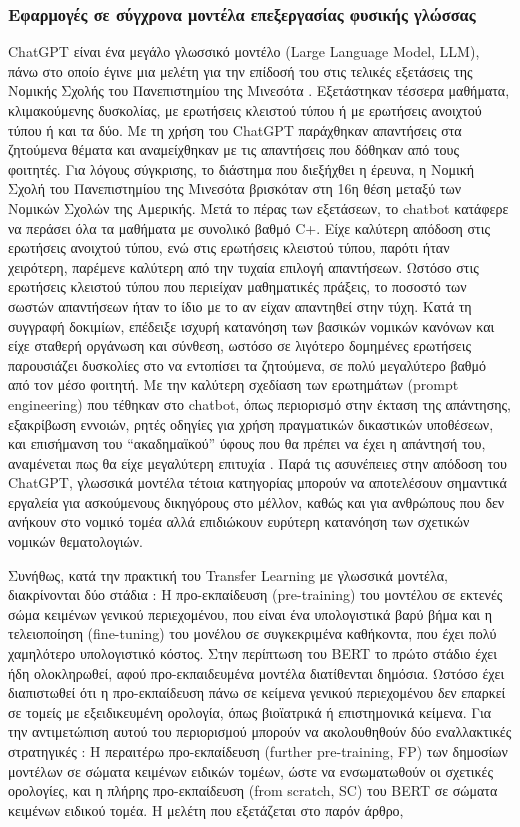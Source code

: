 \documentclass{article}
\begin{document}
\subsubsection{Εφαρμογές σε σύγχρονα μοντέλα επεξεργασίας φυσικής γλώσσας}
 ChatGPT είναι ένα μεγάλο γλωσσικό μοντέλο (Large Language Model, LLM), πάνω στο οποίο έγινε μια μελέτη για την επίδοσή του στις τελικές εξετάσεις της Νομικής Σχολής του Πανεπιστημίου της Μινεσότα \cite{choi-2023}. Εξετάστηκαν τέσσερα μαθήματα, κλιμακούμενης δυσκολίας, με ερωτήσεις κλειστού τύπου ή με ερωτήσεις ανοιχτού τύπου ή και τα δύο. Με τη χρήση του ChatGPT παράχθηκαν απαντήσεις στα ζητούμενα θέματα και αναμείχθηκαν με τις απαντήσεις που δόθηκαν από τους φοιτητές. Για λόγους σύγκρισης, το διάστημα που διεξήχθει η έρευνα, η Νομική Σχολή του Πανεπιστημίου της Μινεσότα βρισκόταν στη 16η θέση μεταξύ των Νομικών Σχολών της Αμερικής. Μετά το πέρας των εξετάσεων, το chatbot κατάφερε να περάσει όλα τα μαθήματα με συνολικό βαθμό C+. Είχε καλύτερη απόδοση στις ερωτήσεις ανοιχτού τύπου, ενώ στις ερωτήσεις κλειστού τύπου, παρότι ήταν χειρότερη, παρέμενε καλύτερη από την τυχαία επιλογή απαντήσεων. Ωστόσο στις ερωτήσεις κλειστού τύπου που περιείχαν μαθηματικές πράξεις, το ποσοστό των σωστών απαντήσεων ήταν το ίδιο με το αν είχαν απαντηθεί στην τύχη. Κατά τη συγγραφή δοκιμίων, επέδειξε ισχυρή κατανόηση των βασικών νομικών κανόνων και είχε σταθερή οργάνωση και σύνθεση, ωστόσο σε λιγότερο δομημένες ερωτήσεις παρουσιάζει δυσκολίες στο να εντοπίσει τα ζητούμενα, σε πολύ μεγαλύτερο βαθμό από τον μέσο φοιτητή. Με την καλύτερη σχεδίαση των ερωτημάτων (prompt engineering) που τέθηκαν στο chatbot, όπως περιορισμό στην έκταση της απάντησης, εξακρίβωση εννοιών,  ρητές οδηγίες για χρήση πραγματικών δικαστικών υποθέσεων, και επισήμανση του “ακαδημαϊκού” ύφους που θα πρέπει να έχει η απάντησή του, αναμένεται πως θα είχε μεγαλύτερη επιτυχία \cite{choi-2023}. Παρά τις ασυνέπειες στην απόδοση του ChatGPT, γλωσσικά μοντέλα τέτοια κατηγορίας μπορούν να αποτελέσουν σημαντικά εργαλεία για ασκούμενους δικηγόρους στο μέλλον, καθώς και για ανθρώπους που δεν ανήκουν στο νομικό τομέα αλλά επιδιώκουν ευρύτερη κατανόηση των σχετικών νομικών θεματολογιών.
\par Συνήθως, κατά την πρακτική του Transfer Learning με γλωσσικά μοντέλα, διακρίνονται δύο στάδια : Η προ-εκπαίδευση (pre-training) του μοντέλου σε εκτενές σώμα κειμένων γενικού περιεχομένου, που είναι ένα υπολογιστικά βαρύ βήμα και η τελειοποίηση (fine-tuning) του μονέλου σε συγκεκριμένα καθήκοντα, που έχει πολύ χαμηλότερο υπολογιστικό κόστος. Στην περίπτωση του BERT το πρώτο στάδιο έχει ήδη ολοκληρωθεί, αφού προ-εκπαιδευμένα μοντέλα διατίθενται δημόσια. Ωστόσο έχει διαπιστωθεί ότι η προ-εκπαίδευση πάνω σε κείμενα γενικού περιεχομένου δεν επαρκεί σε τομείς με εξειδικευμένη ορολογία, όπως βιοϊατρικά ή επιστημονικά κείμενα. Για την αντιμετώπιση αυτού του περιορισμού μπορούν να ακολουθηθούν δύο εναλλακτικές στρατηγικές : Η περαιτέρω προ-εκπαίδευση (further pre-training, FP) των δημοσίων μοντέλων σε σώματα κειμένων ειδικών τομέων, ώστε να ενσωματωθούν οι σχετικές ορολογίες, και η πλήρης προ-εκπαίδευση (from scratch, SC) του BERT σε σώματα κειμένων ειδικού τομέα. \cite{chalkidis-2020} Η μελέτη που εξετάζεται στο παρόν άρθρο, 
\end{document}
